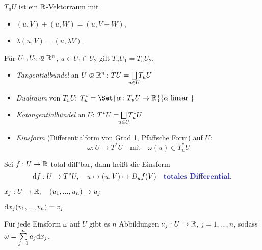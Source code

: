\documentclass{cheat-sheet}
\begin{document}
\begin{bem}
  $T_u U$ ist ein $\mathbb{R}$-Vektorraum mit
  \begin{multicols}{2}
    \begin{itemize}
      \item $(u, V) + (u, W) = (u, V + W)$,
      \item $\lambda (u, V) = (u, \lambda V)$.
    \end{itemize}
  \end{multicols}
\end{bem}

\begin{bem}
  Für $U_1, U_2 \opn \R^n$, $u \in U_1 \cap U_2$ gilt $T_u U_1 = T_u U_2$.
\end{bem}

\begin{defn}
  \begin{itemize}
    \item \emph{Tangentialbündel} an $U \opn \R^n$: $TU = \bigsqcup_{\mathclap{u \in U}} T_u U$
    \item \emph{Dualraum} von $T_u U$: $T_u^* = \Set{ \alpha : T_u U \to \R }{ \alpha \text{ linear } }$
    \item \emph{Kotangentialbündel} an $U$: $T^* U = \bigsqcup_{\mathclap{u \in U}} T_u^* U$
    \item \emph{Einsform} (Differentialform von Grad 1, Pfaffsche Form) auf $U$:
\[ \omega : U \to T^*U \quad \text{mit} \quad \omega(u) \in T_u^*U \]
  \end{itemize}
\end{defn}


\begin{bsp}
  Sei $f : U \to \mathbb{R}$ total diff'bar, dann heißt die Einsform
  \[ \d f : U \to T^*U, \quad u \mapsto (u, V) \mapsto D_u f (V) \quad \text{\emph{totales Differential}.} \]
\end{bsp}

\begin{nota}
  $x_j : U \to \mathbb{R}, \quad (u_1, ..., u_n) \mapsto u_j$ %
\end{nota}

\begin{bem}
  $\mathrm{d} x_j (v_1, ..., v_n) = v_j$
\end{bem}


\iffalse %
\begin{beobachtung}
  Für jede Einsform $\omega$ auf $U$ gibt es $n$ Abbildungen $a_j : U \to \mathbb{R}$, $j = 1, ..., n$, sodass $\omega = \sum_{j=1}^n a_j \d x_j$.
\end{beobachtung}
\end{document}
